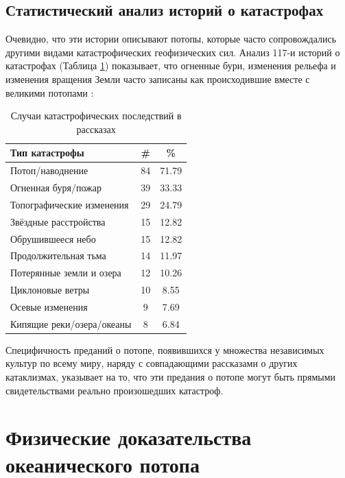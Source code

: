 \documentclass[10pt,twocolumn,letterpaper]{article}
\begin{document}
\subsection{Статистический анализ историй о катастрофах}

Очевидно, что эти истории описывают потопы, которые часто сопровождались другими видами катастрофических геофизических сил. Анализ 117-и историй о катастрофах (Таблица \ref{tab: 1}) показывает, что огненные бури, изменения рельефа и изменения вращения Земли часто записаны как происходившие вместе с великими потопами \cite{14}:

\begin{table}[ht]
\begin{center}
\renewcommand{\arraystretch}{1.2}  %
\begin{tabular}{|l|c|c|}
\hline
\textbf{Тип катастрофы} & \textbf{\#} & \textbf{\%} \\
\hline\hline
Потоп/наводнение            & 84 & 71.79 \\
Огненная буря/пожар         & 39 & 33.33 \\
Топографические изменения     & 29 & 24.79 \\
Звёздные расстройства        & 15 & 12.82 \\
Обрушившееся небо           & 15 & 12.82 \\
Продолжительная тьма        & 14 & 11.97 \\
Потерянные земли и озера   & 12 & 10.26 \\
Циклоновые ветры           & 10 & 8.55  \\
Осевые изменения  & 9 & 7.69  \\
Кипящие реки/озера/океаны  & 8 & 6.84 \\
\hline
\end{tabular}
\end{center}
\caption{Случаи катастрофических последствий в рассказах}
\label{tab: 1}
\end{table}

Специфичность преданий о потопе, появившихся у множества независимых культур по всему миру, наряду с совпадающими рассказами о других катаклизмах, указывает на то, что эти предания о потопе могут быть прямыми свидетельствами реально произошедших катастроф.

\section{Физические доказательства океанического потопа}
\end{document}
